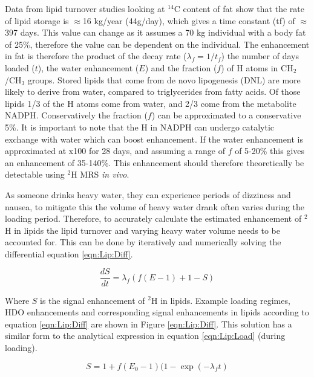 \documentclass[class=article, crop=false]{standalone}
\begin{document}
Data from lipid turnover studies looking at $^{14}$C content of fat show that the rate of lipid storage is $\approx$16 kg/year (44g/day)\cite{Arner2011DynamicsDisease, Spalding2017ImpactTissue}, which gives a time constant (tf) of $\approx$397 days. This value can change as it assumes a 70 kg individual with a body fat of 25\%, therefore the value can be dependent on the individual. The enhancement in fat is therefore the product of the decay rate ($\lambda_f = 1/t_f$) the number of days loaded ($t$), the water enhancement ($E$) and the fraction ($f$) of H atoms in CH$_2$/CH$_3$ groups. Stored lipids that come from de novo lipogenesis (DNL) are more likely to derive from water, compared to triglycerides from fatty acids\cite{Strawford2004AdiposeO}. Of those lipids 1/3 of the H atoms come from water, and 2/3 come from the metabolite NADPH\cite{Zhang2017ChemicalNADPH}. Conservatively the fraction ($f$) can be approximated to a conservative 5\%. It is important to note that the H in NADPH can undergo catalytic exchange with water which can boost enhancement. If the water enhancement is approximated at x100 for 28 days, and assuming a range of $f$ of 5-20\% this gives an enhancement of 35-140\%. This enhancement should therefore theoretically be detectable using $^2$H MRS \textit{in vivo}\cite{Brereton1986PreliminarySpectroscopy}. 

As someone drinks heavy water, they can experience periods of dizziness and nausea\cite{Money1974HeavyAlcohol}, to mitigate this the volume of heavy water drank often varies during the loading period\cite{Strawford2004AdiposeO, Cocking2023DeuteriumDosing}. Therefore, to accurately calculate the estimated enhancement of $^2$H in lipids the lipid turnover and varying heavy water volume needs to be accounted for. This can be done by iteratively and numerically solving the differential equation \ref{eqn:Lip:Diff}.

\begin{equation}
    \frac{dS}{dt} = \lambda_f(f(E-1)+1-S)
    \label{eqn:Lip:Diff}
\end{equation}

Where $S$ is the signal enhancement of $^2$H in lipids. Example loading regimes, HDO enhancements and corresponding signal enhancements in lipids according to equation \ref{eqn:Lip:Diff} are shown in Figure \ref{eqn:Lip:Diff}. This solution has a similar form to the analytical expression in equation \ref{eqn:Lip:Load} (during loading).

\begin{equation}
    S = 1 + f(E_0 - 1)(1 - \exp(-\lambda_ft)
    \label{eqn:Lip:Load}
\end{equation}
\end{document}
